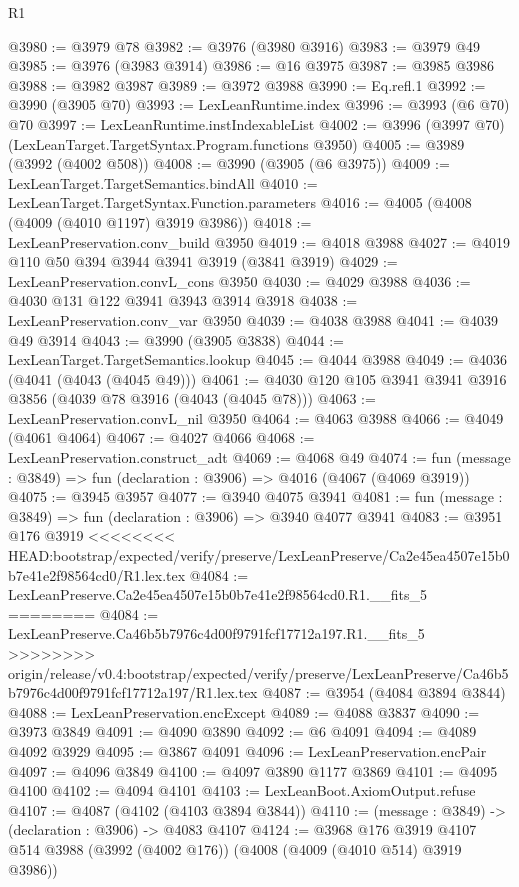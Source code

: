 \begin{lexlean}{R1}
\begin{coremodule}
{{{{{{{{{{{{{{{{{{{{{{{{{{{{{{{{{{{{{{{{{{{{{{{{{{{{{{{{{{{{{{{{{{{{{{{{{{{{{{{{{{{{{{{{{{{{{{{{{{{{{{{{{{{{{{{{{{{{{{{{{{{{{{{{{{{{{{{{{{{{{{{{{{{{{{{{{{{{{{{{{{{{{{{{{{{{{{{{{{{{{{{{{{@3980 := @3979 @78
@3982 := @3976 (@3980 @3916)
@3983 := @3979 @49
@3985 := @3976 (@3983 @3914)
@3986 := @16 @3975
@3987 := @3985 @3986
@3988 := @3982 @3987
@3989 := @3972 @3988
@3990 := Eq.refl.{1}
@3992 := @3990 (@3905 @70)
@3993 := LexLeanRuntime.index
@3996 := @3993 (@6 @70) @70
@3997 := LexLeanRuntime.instIndexableList
@4002 := @3996 (@3997 @70) (LexLeanTarget.TargetSyntax.Program.functions @3950)
@4005 := @3989 (@3992 (@4002 @508))
@4008 := @3990 (@3905 (@6 @3975))
@4009 := LexLeanTarget.TargetSemantics.bindAll
@4010 := LexLeanTarget.TargetSyntax.Function.parameters
@4016 := @4005 (@4008 (@4009 (@4010 @1197) @3919 @3986))
@4018 := LexLeanPreservation.conv_build @3950
@4019 := @4018 @3988
@4027 := @4019 @110 @50 @394 @3944 @3941 @3919 (@3841 @3919)
@4029 := LexLeanPreservation.convL_cons @3950
@4030 := @4029 @3988
@4036 := @4030 @131 @122 @3941 @3943 @3914 @3918
@4038 := LexLeanPreservation.conv_var @3950
@4039 := @4038 @3988
@4041 := @4039 @49 @3914
@4043 := @3990 (@3905 @3838)
@4044 := LexLeanTarget.TargetSemantics.lookup
@4045 := @4044 @3988
@4049 := @4036 (@4041 (@4043 (@4045 @49)))
@4061 := @4030 @120 @105 @3941 @3941 @3916 @3856 (@4039 @78 @3916 (@4043 (@4045 @78)))
@4063 := LexLeanPreservation.convL_nil @3950
@4064 := @4063 @3988
@4066 := @4049 (@4061 @4064)
@4067 := @4027 @4066
@4068 := LexLeanPreservation.construct_adt
@4069 := @4068 @49
@4074 := fun (message : @3849) => fun (declaration : @3906) => @4016 (@4067 (@4069 @3919))
@4075 := @3945 @3957
@4077 := @3940 @4075 @3941
@4081 := fun (message : @3849) => fun (declaration : @3906) => @3940 @4077 @3941
@4083 := @3951 @176 @3919
<<<<<<<< HEAD:bootstrap/expected/verify/preserve/LexLeanPreserve/Ca2e45ea4507e15b0b7e41e2f98564cd0/R1.lex.tex
@4084 := LexLeanPreserve.Ca2e45ea4507e15b0b7e41e2f98564cd0.R1.__fits_5
========
@4084 := LexLeanPreserve.Ca46b5b7976c4d00f9791fcf17712a197.R1.__fits_5
>>>>>>>> origin/release/v0.4:bootstrap/expected/verify/preserve/LexLeanPreserve/Ca46b5b7976c4d00f9791fcf17712a197/R1.lex.tex
@4087 := @3954 (@4084 @3894 @3844)
@4088 := LexLeanPreservation.encExcept
@4089 := @4088 @3837
@4090 := @3973 @3849
@4091 := @4090 @3890
@4092 := @6 @4091
@4094 := @4089 @4092 @3929
@4095 := @3867 @4091
@4096 := LexLeanPreservation.encPair
@4097 := @4096 @3849
@4100 := @4097 @3890 @1177 @3869
@4101 := @4095 @4100
@4102 := @4094 @4101
@4103 := LexLeanBoot.AxiomOutput.refuse
@4107 := @4087 (@4102 (@4103 @3894 @3844))
@4110 := (message : @3849) -> (declaration : @3906) -> @4083 @4107
@4124 := @3968
    @176
    @3919
    @4107
    @514
    @3988
    (@3992 (@4002 @176))
    (@4008 (@4009 (@4010 @514) @3919 @3986))
}}}}}}}}}}}}}}}}}}}}}}}}}}}}}}}}}}}}}}}}}}}}}}}}}}}}}}}}}}}}}}}}}}}}}}}}}}}}}}}}}}}}}}}}}}}}}}}}}}}}}}}}}}}}}}}}}}}}}}}}}}}}}}}}}}}}}}}}}}}}}}}}}}}}}}}}}}}}}}}}}}}}}}}}}}}}}}}}}}}}}}}}}}
\end{coremodule}
\end{lexlean}
